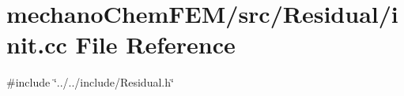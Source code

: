 \section{mechano\+Chem\+F\+E\+M/src/\+Residual/init.cc File Reference}
\label{init_8cc}
{\ttfamily \#include \char`\"{}../../include/\+Residual.\+h\char`\"{}}\newline
